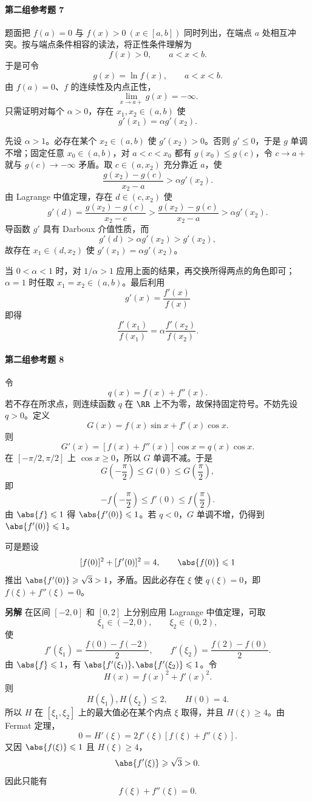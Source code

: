 \paragraph{第二组参考题 7}
\begin{xsolution}
题面把 $f(a)=0$ 与 $f(x)>0\ (x\in[a,b])$ 同时列出，在端点 $a$ 处相互冲突。按与端点条件相容的读法，将正性条件理解为
\[
  f(x)>0,\qquad a<x<b.
\]
于是可令
\[
  g(x)=\ln f(x),\qquad a<x<b.
\]
由 $f(a)=0$、$f$ 的连续性及内点正性，
\[
  \lim_{x\to a+}g(x)=-\infty.
\]
只需证明对每个 $\alpha>0$，存在 $x_1,x_2\in(a,b)$ 使
\[
  g'(x_1)=\alpha g'(x_2).
\]

先设 $\alpha>1$。必存在某个 $x_2\in(a,b)$ 使 $g'(x_2)>0$。否则 $g'\leqslant0$，于是 $g$ 单调不增；固定任意 $x_0\in(a,b)$，对 $a<c<x_0$ 都有 $g(x_0)\leqslant g(c)$，令 $c\to a+$ 就与 $g(c)\to-\infty$ 矛盾。取 $c\in(a,x_2)$ 充分靠近 $a$，使
\[
  \frac{g(x_2)-g(c)}{x_2-a}>\alpha g'(x_2).
\]
由 Lagrange 中值定理，存在 $d\in(c,x_2)$ 使
\[
  g'(d)=\frac{g(x_2)-g(c)}{x_2-c}
  >\frac{g(x_2)-g(c)}{x_2-a}
  >\alpha g'(x_2).
\]
导函数 $g'$ 具有 Darboux 介值性质，而
\[
  g'(d)>\alpha g'(x_2)>g'(x_2),
\]
故存在 $x_1\in(d,x_2)$ 使 $g'(x_1)=\alpha g'(x_2)$。

当 $0<\alpha<1$ 时，对 $1/\alpha>1$ 应用上面的结果，再交换所得两点的角色即可；$\alpha=1$ 时任取 $x_1=x_2\in(a,b)$。最后利用
\[
  g'(x)=\frac{f'(x)}{f(x)}
\]
即得
\[
  \frac{f'(x_1)}{f(x_1)}
  =\alpha\frac{f'(x_2)}{f(x_2)}.
\]
\end{xsolution}

\paragraph{第二组参考题 8}
\begin{xsolution}
令
\[
  q(x)=f(x)+f''(x).
\]
若不存在所求点，则连续函数 $q$ 在 $\RR$ 上不为零，故保持固定符号。不妨先设 $q>0$。定义
\[
  G(x)=f(x)\sin x+f'(x)\cos x.
\]
则
\[
  G'(x)=[f(x)+f''(x)]\cos x=q(x)\cos x.
\]
在 $[-\pi/2,\pi/2]$ 上 $\cos x\geqslant0$，所以 $G$ 单调不减。于是
\[
  G\left(-\frac\pi2\right)
  \leqslant G(0)
  \leqslant G\left(\frac\pi2\right),
\]
即
\[
  -f\left(-\frac\pi2\right)
  \leqslant f'(0)
  \leqslant f\left(\frac\pi2\right).
\]
由 $\abs{f}\leqslant1$ 得 $\abs{f'(0)}\leqslant1$。若 $q<0$，$G$ 单调不增，仍得到 $\abs{f'(0)}\leqslant1$。

可是题设
\[
  [f(0)]^2+[f'(0)]^2=4,
  \qquad \abs{f(0)}\leqslant1
\]
推出 $\abs{f'(0)}\geqslant\sqrt3>1$，矛盾。因此必存在 $\xi$ 使 $q(\xi)=0$，即 $f(\xi)+f''(\xi)=0$。

\medskip
\noindent\textbf{另解}\quad
在区间 $[-2,0]$ 和 $[0,2]$ 上分别应用 Lagrange 中值定理，可取
\[
  \xi_1\in(-2,0),\qquad \xi_2\in(0,2),
\]
使
\[
  f'(\xi_1)=\frac{f(0)-f(-2)}2,
  \qquad
  f'(\xi_2)=\frac{f(2)-f(0)}2.
\]
由 $\abs{f}\leqslant1$，有 $\abs{f'(\xi_1)},\abs{f'(\xi_2)}\leqslant1$。令
\[
  H(x)=f(x)^2+f'(x)^2.
\]
则
\[
  H(\xi_1),H(\xi_2)\leqslant2,
  \qquad
  H(0)=4.
\]
所以 $H$ 在 $[\xi_1,\xi_2]$ 上的最大值必在某个内点 $\xi$ 取得，并且 $H(\xi)\geqslant4$。由 Fermat 定理，
\[
  0=H'(\xi)=2f'(\xi)[f(\xi)+f''(\xi)].
\]
又因 $\abs{f(\xi)}\leqslant1$ 且 $H(\xi)\geqslant4$，
\[
  \abs{f'(\xi)}\geqslant\sqrt3>0.
\]
因此只能有
\[
  f(\xi)+f''(\xi)=0.
\]
\end{xsolution}


